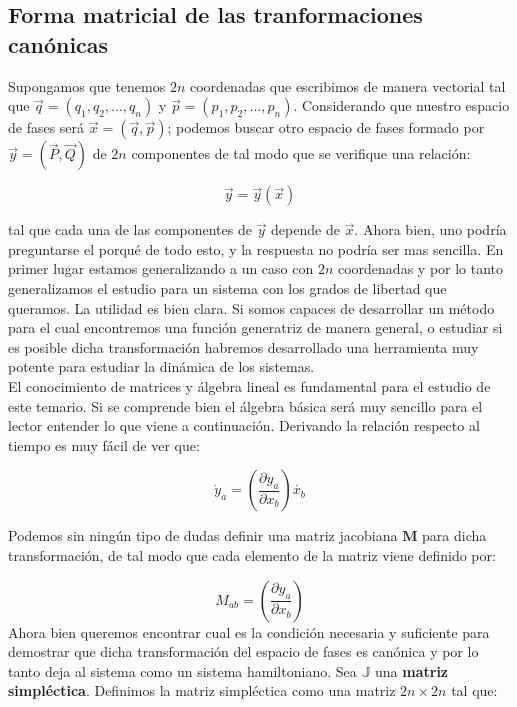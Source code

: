 \documentclass[12pt,a4paper]{article}
\numberwithin{equation}{section}
\numberwithin{figure}{section}
\newcommand{\parentesis}[1]{\left( #1  \right)}
\newcommand{\parciales}[2]{\frac{\partial #1}{\partial #2}}
\newcommand{\Mn}{\mathbf{M}}
\begin{document}
\subsection{Forma matricial de las tranformaciones canónicas}

Supongamos que tenemos $2n$ coordenadas que escribimos de manera vectorial tal que $\vec{q}=(q_1,q_2,\ldots,q_n)$ y $\vec{p} = (p_1,p_2,\ldots,p_n)$. Considerando que nuestro espacio de fases será $\vec{x} = (\vec{q}, \vec{p})$; podemos buscar otro espacio de fases formado por $\vec{y} = (\vec{P},\vec{Q})$ de $2n$ componentes de tal modo que se verifique una relación:

\begin{equation}
\vec{y} = \vec{y} (\vec{x}) 
\end{equation}

tal que cada una de las componentes de $\vec{y}$ depende de $\vec{x}$. Ahora bien, uno podría preguntarse el porqué de todo esto, y la respuesta no podría ser mas sencilla. En primer lugar estamos generalizando a un caso con $2n$ coordenadas y por lo tanto generalizamos el estudio para un sistema con los grados de libertad que queramos. La utilidad es bien clara. Si somos capaces de desarrollar un método para el cual encontremos una función generatriz de manera general, o estudiar si es posible dicha transformación habremos desarrollado una herramienta muy potente para estudiar la dinámica de los sistemas. \\

El conocimiento de matrices y álgebra lineal es fundamental para el estudio de este temario. Si se comprende bien el álgebra básica será muy sencillo para el lector entender lo que viene a continuación. Derivando la relación respecto al tiempo es muy fácil de ver que:

\begin{equation}
\dot{y}_a = \parentesis{\parciales{y_a}{x_b}} \dot{x_b}
\end{equation}

Podemos sin ningún tipo de dudas definir una matriz jacobiana $\Mn$ para dicha transformación, de tal modo que cada elemento de la matriz viene definido por:

\begin{equation}
M_{ab} =  \parentesis{\parciales{y_a}{x_b}} 
\end{equation}
Ahora bien queremos encontrar cual es la condición necesaria y suficiente para demostrar que dicha transformación del espacio de fases es canónica y por lo tanto deja al sistema como un sistema hamiltoniano. Sea $\mathbb{J}$ una \textbf{matriz simpléctica}. Definimos la matriz simpléctica como una matriz $2n \times 2n $ tal que:
\end{document}
